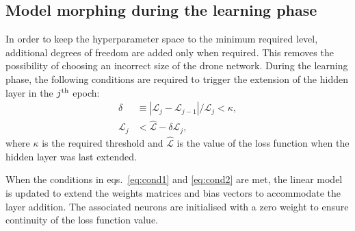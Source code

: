 \subsection{Model morphing during the learning phase}

In order to keep the hyperparameter space to the minimum required level,
additional degrees of freedom are added only when required. 
This removes the possibility of choosing an incorrect size of the 
drone network. During the learning phase, the following conditions are required
to trigger the extension of the hidden layer in the $j^{\rm th}$ epoch:
\begin{align}
\delta &\equiv |\mathcal{L}_j-\mathcal{L}_{j-1}|/\mathcal{L}_j < \kappa,\label{eq:cond1}\\ 
\mathcal{L}_j &< \hat{\mathcal{L}} - \delta\mathcal{L}_j \label{eq:cond2},
\end{align}
where $\kappa$ is the required threshold and $\hat{\mathcal{L}}$ is the value
of the loss function when the hidden layer was last extended.

When the conditions in eqs.~\ref{eq:cond1} and \ref{eq:cond2} are met, the linear model
is updated to extend the weights matrices and bias vectors
to accommodate the layer addition.
The associated neurons are initialised with a zero weight
to ensure continuity of the loss function value.
